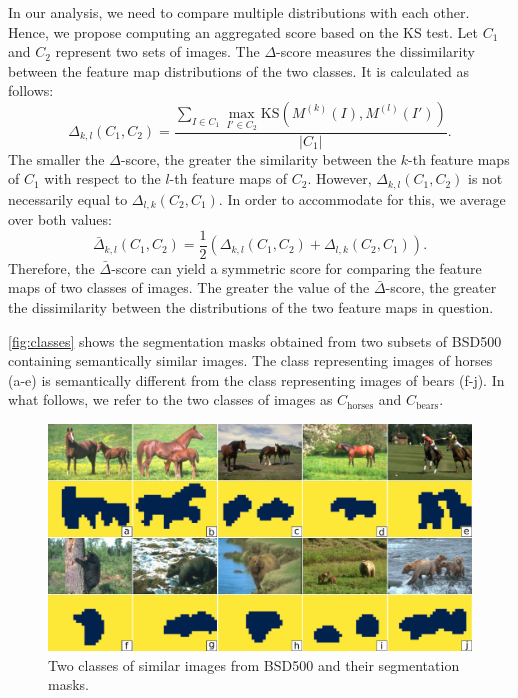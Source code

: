 In our analysis, we need to compare multiple distributions with each other. Hence, we propose computing an aggregated score based on the KS test. Let $C_1$ and $C_2$ represent two sets of images. The $\Delta$-score measures the dissimilarity between the feature map distributions of the two classes. It is calculated as follows:
\begin{equation}
    \Delta_{k,l}(C_1, C_2) = \frac{\sum_{I \in C_1}{\max_{I' \in C_2} \text{KS}(M^{(k)}\!(I), M^{(l)}\!(I'))}}{|C_1|}.
    \label{eq:delta}
\end{equation}
The smaller the $\Delta$-score, the greater the similarity between the $k$-th feature maps of $C_1$ with respect to the $l$-th feature maps of $C_2$. However, $\Delta_{k,l}(C_1, C_2)$ is not necessarily equal to $\Delta_{l,k}(C_2, C_1)$. In order to accommodate for this, we average over both values:
\begin{equation}
    \bar{\Delta}_{k,l}(C_1, C_2) = \frac{1}{2} (\Delta_{k,l}(C_1, C_2) + \Delta_{l,k}(C_2, C_1)).
    \label{eq:h_score}
\end{equation}
Therefore, the $\bar{\Delta}$-score can yield a symmetric score for comparing the feature maps of two classes of images. The greater the value of the $\bar{\Delta}$-score, the greater the dissimilarity between the distributions of the two feature maps in question.

\autoref{fig:classes} shows the segmentation masks obtained from two subsets of BSD500 containing semantically similar images. The class representing images of horses (a-e) is semantically different from the class representing images of bears (f-j). In what follows, we refer to the two classes of images as $C_{\text{horses}}$ and $C_{\text{bears}}$.

\begin{figure}[t]
    \centering
        \centering
        \includegraphics[width=\textwidth]{figures/classes.pdf}
    \caption{Two classes of similar images from BSD500 and their segmentation masks.}
    \label{fig:classes}
\end{figure}


